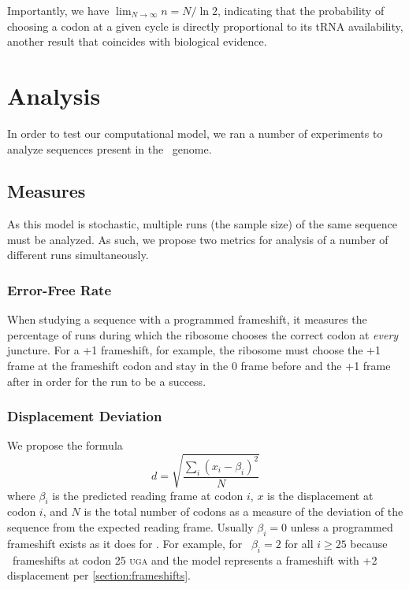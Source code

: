 \documentclass[12pt]{article}
\numberwithin{equation}{section}
\begin{document}
Importantly, we have $\displaystyle\lim_{N\rightarrow\infty} n = N/\ln{2}$, indicating 
that the probability of choosing a codon at a given cycle is directly proportional 
to its tRNA availability, another result that coincides with biological evidence.
\section{Analysis}
In order to test our computational model, we ran a number of
experiments to analyze sequences present in the \ecoli\ genome.

\subsection{Measures}
\label{section:metrics}

As this model is stochastic, multiple runs (the sample size) of the same sequence must be analyzed.
As such, we propose two metrics for analysis of a number of different runs 
simultaneously. 

\subsubsection{Error-Free Rate}
When studying a
sequence with a programmed frameshift, it measures the percentage of runs 
during which the ribosome chooses the correct codon
at \emph{every} juncture.  For a +1 frameshift, for example, the ribosome must
choose the +1 frame at the frameshift codon and stay in the 0 frame before
and the +1 frame after in order for the run to be a success.

\subsubsection{Displacement Deviation}
\label{section:deviation}

We propose the formula
\begin{equation}
    d = \sqrt{\frac{\sum_i \left(x_i - \beta_i\right)^2}{N}}
\end{equation}
where $\beta_i$ is the predicted reading frame at codon $i$, $x$ is
the displacement at codon $i$, and $N$ is the total number of codons
as a measure of the deviation of the sequence from the expected
reading frame.  Usually $\beta_i = 0$ unless a programmed frameshift
exists as it does for \prfB.  For example, for \prfB\ $\beta_i = 2$
for all $i \geq 25$ because \prfB\ frameshifts at codon 25
\textsc{uga} and the model represents a frameshift with +2
displacement per \autoref{section:frameshifts}.
\end{document}
